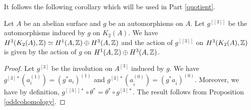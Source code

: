 It follows the following corollary which will be used in Part \ref{quotient}.
\begin{cor}\label{actionH3}
Let $A$ be an abelian surface and $g$ be an automorphisms on $A$. Let $g^{[[3]]}$ be the automorphisms induced by $g$ on $K_2(A)$.
We have $H^3(K_2(A),\mathbb{Z})\simeq H^1(A,\mathbb{Z})\oplus H^3(A,\mathbb{Z})$ and the action of $g^{[[3]]}$ on $H^3(K_2(A),\mathbb{Z})$ is given by the action of $g$ on $H^1(A,\mathbb{Z})\oplus H^3(A,\mathbb{Z})$.
\end{cor}
\begin{proof}
Let $g^{[3]}$ be the involution on $A^{[3]}$ induced by $g$.
We have $g^{[3]*}(a_{i}^{(1)})=(g^{*}a_{i})^{(1)}$ and $g^{[3]*}(a_{\overline{i}}^{(0)})=(g^{*}a_{\overline{i}})^{(0)}$.
Moreover, we have by definition, $g^{[[3]]*}\circ \theta^{*}=\theta^{*}\circ g^{[3]*}$.
The result follows from Proposition \ref{oddcohomology}.
\end{proof}

